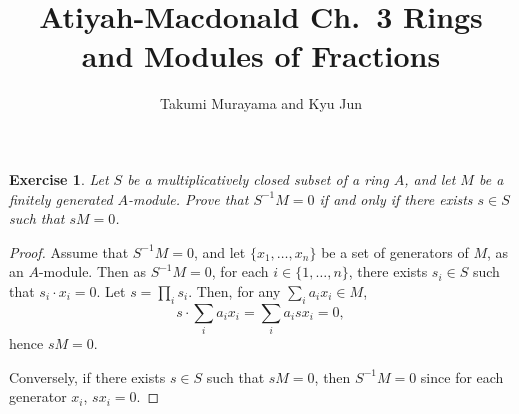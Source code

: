 \documentclass[12pt,letterpaper]{article}
\title{Atiyah-Macdonald Ch.~3 Rings and Modules of Fractions}
\author{Takumi Murayama and Kyu Jun}
\newtheorem{problem}{Exercise}[section]
\theoremstyle{definition}
\theoremstyle{remark}
\numberwithin{figure}{problem}
\numberwithin{equation}{section}
\begin{document}
\maketitle
\setcounter{section}{3}
\begin{problem}
  Let $S$ be a multiplicatively closed subset of a ring $A$, and let $M$ be a finitely generated $A$-module. Prove that $S^{-1}M = 0$ if and only if there exists $s \in S$ such that $sM = 0$. 
\end{problem}
\begin{proof}
  Assume that $S^{-1}M = 0$, and let $\{x_1, \ldots, x_n\}$ be a set of
  generators of $M$, as an $A$-module. Then as $S^{-1}M = 0$, for each $i \in
  \{1, \ldots, n\}$, there exists $s_i \in S$ such that $s_i \cdot x_i=0$. Let $s= \prod_{i} s_i$. Then, for any $\sum_{i}a_ix_i \in M$,
  \begin{equation*}
    s \cdot \sum_{i}a_ix_i = \sum_{i}a_isx_i = 0,
  \end{equation*}
  hence $sM = 0$.
  \par Conversely, if there exists $s \in S$ such that $sM = 0$, then
  $S^{-1}M = 0$ since for each generator $x_i$, $sx_i = 0$.
\end{proof}
\end{document}
